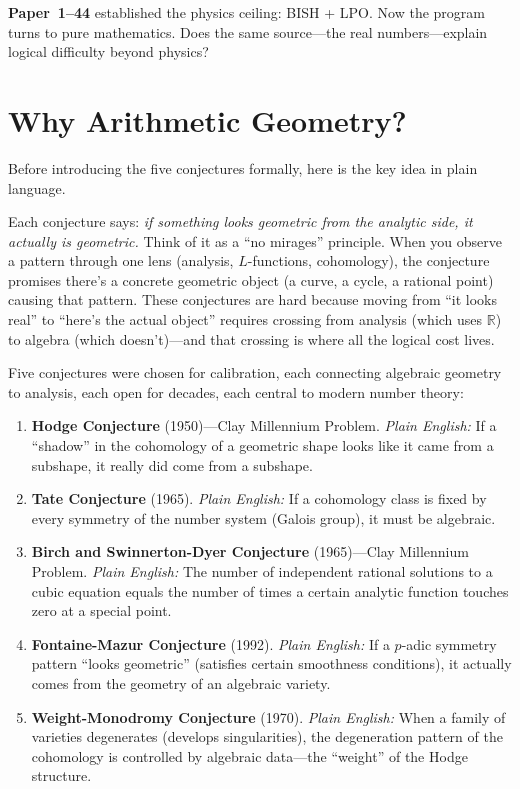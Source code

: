 \documentclass[11pt,twoside,openany]{report}
\theoremstyle{remark}
\newcommand{\BISH}{\textsf{BISH}}
\newcommand{\LPO}{\textsf{LPO}}
\newcommand{\paperref}[1]{\textbf{Paper~#1}}
\begin{document}
\paperref{1--44} established the physics ceiling: \BISH{} + \LPO. Now the program turns to pure mathematics. Does the same source---the real numbers---explain logical difficulty beyond physics?

\section{Why Arithmetic Geometry?}

Before introducing the five conjectures formally, here is the key idea in plain language.

\begin{analogybox}
Each conjecture says: \emph{if something looks geometric from the analytic side, it actually is geometric.} Think of it as a ``no mirages'' principle. When you observe a pattern through one lens (analysis, $L$-functions, cohomology), the conjecture promises there's a concrete geometric object (a curve, a cycle, a rational point) causing that pattern. These conjectures are hard because moving from ``it looks real'' to ``here's the actual object'' requires crossing from analysis (which uses $\mathbb{R}$) to algebra (which doesn't)---and that crossing is where all the logical cost lives.
\end{analogybox}

Five conjectures were chosen for calibration, each connecting algebraic geometry to analysis, each open for decades, each central to modern number theory:

\begin{enumerate}
  \item \textbf{Hodge Conjecture} (1950)---Clay Millennium Problem.
    \emph{Plain English:} If a ``shadow'' in the cohomology of a geometric shape looks like it came from a subshape, it really did come from a subshape.
  \item \textbf{Tate Conjecture} (1965).
    \emph{Plain English:} If a cohomology class is fixed by every symmetry of the number system (Galois group), it must be algebraic.
  \item \textbf{Birch and Swinnerton-Dyer Conjecture} (1965)---Clay Millennium Problem.
    \emph{Plain English:} The number of independent rational solutions to a cubic equation equals the number of times a certain analytic function touches zero at a special point.
  \item \textbf{Fontaine-Mazur Conjecture} (1992).
    \emph{Plain English:} If a $p$-adic symmetry pattern ``looks geometric'' (satisfies certain smoothness conditions), it actually comes from the geometry of an algebraic variety.
  \item \textbf{Weight-Monodromy Conjecture} (1970).
    \emph{Plain English:} When a family of varieties degenerates (develops singularities), the degeneration pattern of the cohomology is controlled by algebraic data---the ``weight'' of the Hodge structure.
\end{enumerate}
\end{document}
